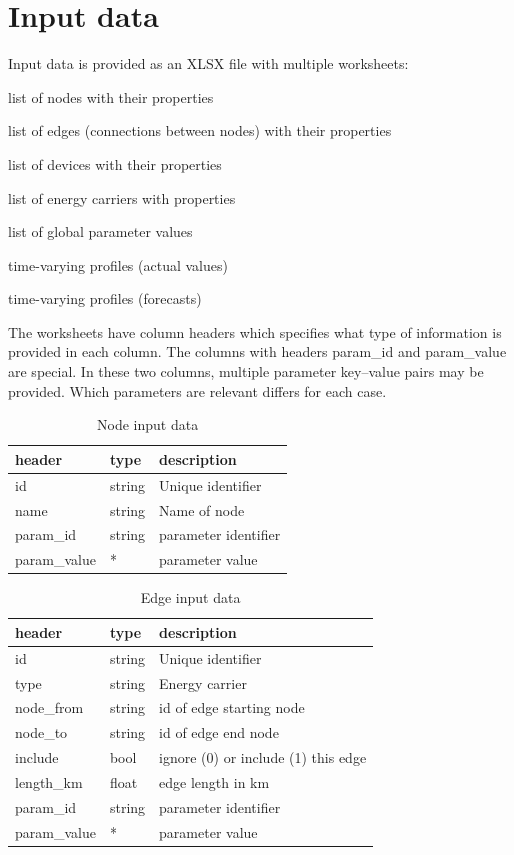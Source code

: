 \documentclass[12pt]{article}
\begin{document}
\section{Input data}
Input data is provided as an XLSX file with multiple worksheets:

\begin{description}[labelindent=\parindent,topsep=6pt]
\item[node] list of nodes with their properties
\item[edge] list of edges (connections between nodes) with their properties
\item[device] list of devices with their properties
\item[carriers] list of energy carriers with properties
\item[parameters] list of global parameter values
\item[profiles] time-varying profiles (actual values)
\item[profiles\_forecast] time-varying profiles (forecasts)
\end{description}

The worksheets have column headers which specifies what type of information is provided in each column. The columns with headers param\_id and param\_value are special. In these two columns, multiple parameter key--value pairs may be provided. Which parameters are relevant differs for each case.

\begin{table}[h]
\caption{Node input data}
\begin{tabular}{lll}
	\hline
	header & type & description \\
	\hline
	id & string & Unique identifier \\
	name & string & Name of node \\
	param\_id & string & parameter identifier \\
	param\_value & * & parameter value
\end{tabular}
\end{table}

\begin{table}[h]
\caption{Edge input data}
\begin{tabular}{lll}
	\hline
	header & type & description \\
	\hline
	id & string & Unique identifier \\
	type & string & Energy carrier \\
	node\_from & string &  id of edge starting node \\
	node\_to & string &  id of edge end node \\
	include & bool & ignore (0) or include (1) this edge \\
	length\_km & float & edge length in km \\
	param\_id & string & parameter identifier \\
	param\_value & * & parameter value
\end{tabular}
\end{table}
\end{document}
